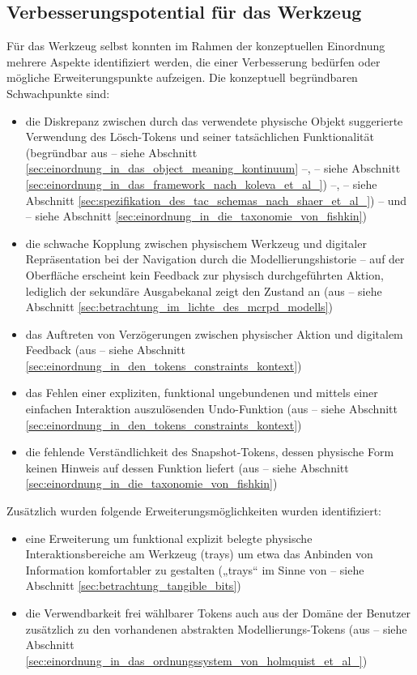 
\subsection{Verbesserungspotential für das Werkzeug} %
\label{sub:verbesserungspotential_für_das_werkzeug}

Für das Werkzeug selbst konnten im Rahmen der konzeptuellen Einordnung mehrere Aspekte identifiziert werden, die einer Verbesserung bedürfen oder mögliche Erweiterungspunkte aufzeigen. Die konzeptuell begründbaren Schwachpunkte sind:
\begin{itemize}
	\item die Diskrepanz zwischen durch das verwendete physische Objekt suggerierte Verwendung des Lösch-Tokens und seiner tatsächlichen Funktionalität (begründbar aus \citep{Underkoffler99} -- siehe Abschnitt \ref{sec:einordnung_in_das_object_meaning_kontinuum} --, \citep{Koleva03} -- siehe Abschnitt \ref{sec:einordnung_in_das_framework_nach_koleva_et_al_}) --, \citep{Shaer04} -- siehe Abschnitt \ref{sec:spezifikation_des_tac_schemas_nach_shaer_et_al_}) -- und \citep{Fishkin04} -- siehe Abschnitt \ref{sec:einordnung_in_die_taxonomie_von_fishkin})
	\item die schwache Kopplung zwischen physischem Werkzeug und digitaler Repräsentation bei der Navigation durch die Modellierungshistorie -- auf der Oberfläche erscheint kein Feedback zur physisch durchgeführten Aktion, lediglich der sekundäre Ausgabekanal zeigt den Zustand an (aus \citep{Ullmer00} -- siehe Abschnitt \ref{sec:betrachtung_im_lichte_des_mcrpd_modells})
	\item das Auftreten von Verzögerungen zwischen physischer Aktion und digitalem Feedback (aus \citep{Bellotti02} -- siehe Abschnitt \ref{sec:einordnung_in_den_tokens_constraints_kontext})
	\item das Fehlen einer expliziten, funktional ungebundenen und mittels einer einfachen Interaktion auszulösenden Undo-Funktion (aus \citep{Bellotti02} -- siehe Abschnitt \ref{sec:einordnung_in_den_tokens_constraints_kontext})
	\item die fehlende Verständlichkeit des Snapshot-Tokens, dessen physische Form keinen Hinweis auf dessen Funktion liefert (aus \citep{Fishkin04} -- siehe Abschnitt \ref{sec:einordnung_in_die_taxonomie_von_fishkin})
\end{itemize}

Zusätzlich wurden folgende Erweiterungsmöglichkeiten wurden identifiziert:
\begin{itemize}
	\item eine Erweiterung um funktional explizit belegte physische Interaktionsbereiche am Werkzeug (trays) um etwa das Anbinden von Information komfortabler zu gestalten („trays“ im Sinne von \citep{Ishii97} -- siehe Abschnitt \ref{sec:betrachtung_tangible_bits})
	\item die Verwendbarkeit frei wählbarer Tokens auch aus der Domäne der Benutzer zusätzlich zu den vorhandenen abstrakten Modellierungs-Tokens (aus \citep{Holmquist99} -- siehe Abschnitt \ref{sec:einordnung_in_das_ordnungssystem_von_holmquist_et_al_})
\end{itemize}

